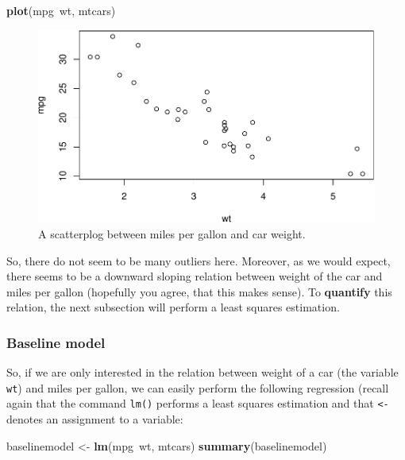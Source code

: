 \documentclass[]{article}
\newenvironment{Shaded}{\begin{snugshade}}{\end{snugshade}}
\newcommand{\KeywordTok}[1]{\textcolor[rgb]{0.13,0.29,0.53}{\textbf{{#1}}}}
\newcommand{\StringTok}[1]{\textcolor[rgb]{0.31,0.60,0.02}{{#1}}}
\newcommand{\NormalTok}[1]{{#1}}
\begin{document}
\begin{Shaded}
\begin{Highlighting}[]
\KeywordTok{plot}\NormalTok{(mpg~wt, mtcars)}
\end{Highlighting}
\end{Shaded}

\begin{figure}[htbp]
\centering
\includegraphics{./unnamed-chunk-31-1.pdf}
\caption{\label{fig:unnamed-chunk-31}A scatterplog between miles per gallon
and car weight.}
\end{figure}

So, there do not seem to be many outliers here. Moreover, as we would
expect, there seems to be a downward sloping relation between weight of
the car and miles per gallon (hopefully you agree, that this makes
sense). To \textbf{quantify} this relation, the next subsection will
perform a least squares estimation.

\subsubsection{Baseline model}\label{baseline-model}

So, if we are only interested in the relation between weight of a car
(the variable \texttt{wt}) and miles per gallon, we can easily perform
the following regression (recall again that the command \texttt{lm()}
performs a least squares estimation and that \texttt{\textless{}-}
denotes an assignment to a variable:

\begin{Shaded}
\begin{Highlighting}[]
\NormalTok{baselinemodel <-}\StringTok{ }\KeywordTok{lm}\NormalTok{(mpg~wt, mtcars)}
\KeywordTok{summary}\NormalTok{(baselinemodel)}
\end{Highlighting}
\end{Shaded}
\end{document}
